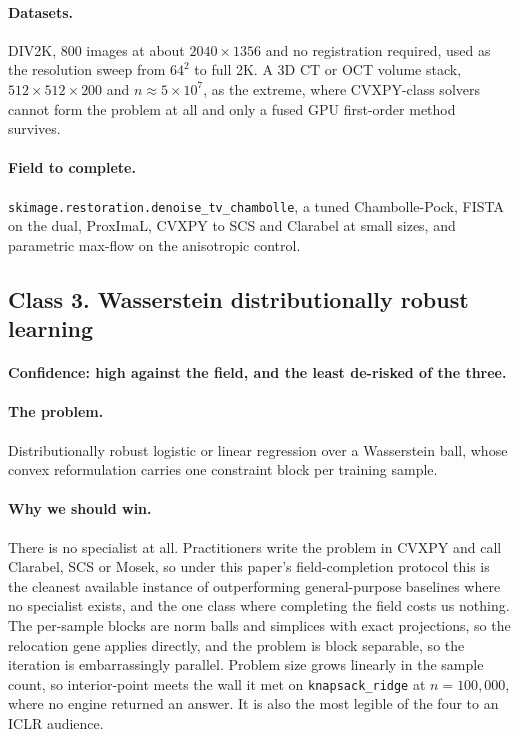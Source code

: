 \documentclass[11pt]{article}
\begin{document}
\paragraph{Datasets.} DIV2K, 800 images at about $2040 \times 1356$ and no
registration required, used as the resolution sweep from $64^2$ to full 2K. A 3D
CT or OCT volume stack, $512 \times 512 \times 200$ and $n \approx 5\times10^7$,
as the extreme, where CVXPY-class solvers cannot form the problem at all and
only a fused GPU first-order method survives.

\paragraph{Field to complete.}
\texttt{skimage.restoration.denoise\_tv\_chambolle}, a tuned Chambolle-Pock,
FISTA on the dual, ProxImaL, CVXPY to SCS and Clarabel at small sizes, and
parametric max-flow on the anisotropic control.

\subsection{Class 3. Wasserstein distributionally robust learning}

\paragraph{Confidence: high against the field, and the least de-risked of the
three.}

\paragraph{The problem.} Distributionally robust logistic or linear regression
over a Wasserstein ball, whose convex reformulation carries one constraint block
per training sample.

\paragraph{Why we should win.} There is no specialist at all. Practitioners
write the problem in CVXPY and call Clarabel, SCS or Mosek, so under this
paper's field-completion protocol this is the cleanest available instance of
outperforming general-purpose baselines where no specialist exists, and the one
class where completing the field costs us nothing. The per-sample blocks are
norm balls and simplices with exact projections, so the relocation gene applies
directly, and the problem is block separable, so the iteration is embarrassingly
parallel. Problem size grows linearly in the sample count, so interior-point
meets the wall it met on \texttt{knapsack\_ridge} at $n = 100{,}000$, where no
engine returned an answer. It is also the most legible of the four to an ICLR
audience.
\end{document}
